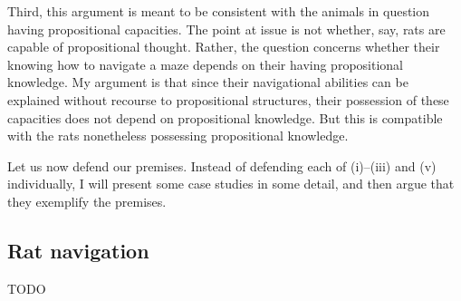 Third, this argument is meant to be consistent with the animals in question having propositional capacities.
The point at issue is not whether, say, rats are capable of propositional thought.
Rather, the question concerns whether their knowing how to navigate a maze depends on their having propositional knowledge.
My argument is that since their navigational abilities can be explained without recourse to propositional structures, their possession of these capacities does not depend on propositional knowledge.
But this is compatible with the rats nonetheless possessing propositional knowledge.

Let us now defend our premises.
Instead of defending each of (i)--(iii) and (v) individually, I will present some case studies in some detail, and then argue that they exemplify the premises.

\subsection{Rat navigation}

TODO
